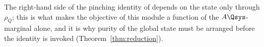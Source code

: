 
The right-hand side of the pinching identity of 
depends on the state only through $\rho_Q$; this is what makes the objective of
this module a function of the $A\Qsys$-marginal alone, and it is why purity of
the global state must be arranged before the identity is invoked
(Theorem~\ref{thm:reduction}).

